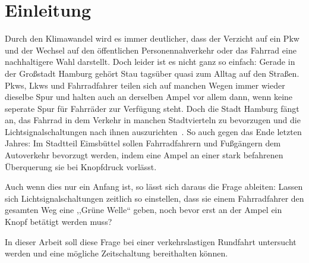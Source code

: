 %
\chapter{Einleitung}\label{ch:einleitung}

Durch den Klimawandel wird es immer deutlicher, dass der Verzicht auf ein Pkw und der Wechsel auf den öffentlichen Personennahverkehr oder das Fahrrad eine nachhaltigere Wahl darstellt.
Doch leider ist es nicht ganz so einfach: Gerade in der Großstadt Hamburg gehört Stau tagsüber quasi zum Alltag auf den Straßen.
Pkws, Lkws und Fahrradfahrer teilen sich auf manchen Wegen immer wieder dieselbe Spur und halten auch an derselben Ampel vor allem dann, wenn keine seperate Spur für Fahrräder zur Verfügung steht.
Doch die Stadt Hamburg fängt an, das Fahrrad in dem Verkehr in manchen Stadtvierteln zu bevorzugen und die Lichtsignalschaltungen nach ihnen auszurichten~\cite{NDR2022}.
So auch gegen das Ende letzten Jahres: Im Stadtteil Eimsbüttel sollen Fahrradfahrern und Fußgängern dem Autoverkehr bevorzugt werden, indem eine Ampel an einer stark befahrenen Überquerung sie bei Knopfdruck vorlässt\cite{NDR2022}.

Auch wenn dies nur ein Anfang ist, so lässt sich daraus die Frage ableiten: Lassen sich Lichtsignalschaltungen zeitlich so einstellen, dass sie einem Fahrradfahrer den gesamten Weg eine ,,Grüne Welle`` geben, noch bevor erst an der Ampel ein Knopf betätigt werden muss?

In dieser Arbeit soll diese Frage bei einer verkehrslastigen Rundfahrt untersucht werden und eine mögliche Zeitschaltung bereithalten können.





